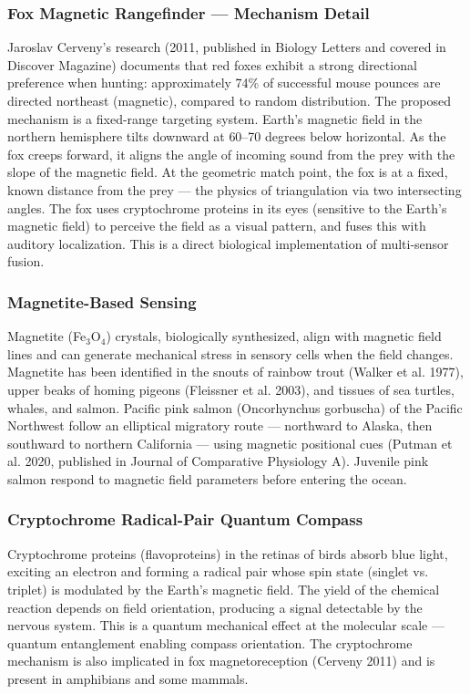 \documentclass[11pt,letterpaper]{article}
\begin{document}
\subsubsection{Fox Magnetic Rangefinder --- Mechanism Detail}
Jaroslav Cerveny's research (2011, published in Biology Letters and covered in Discover Magazine) documents that red foxes exhibit a strong directional preference when hunting: approximately 74\% of successful mouse pounces are directed northeast (magnetic), compared to random distribution. The proposed mechanism is a fixed-range targeting system. Earth's magnetic field in the northern hemisphere tilts downward at 60--70 degrees below horizontal. As the fox creeps forward, it aligns the angle of incoming sound from the prey with the slope of the magnetic field. At the geometric match point, the fox is at a fixed, known distance from the prey --- the physics of triangulation via two intersecting angles. The fox uses cryptochrome proteins in its eyes (sensitive to the Earth's magnetic field) to perceive the field as a visual pattern, and fuses this with auditory localization. This is a direct biological implementation of multi-sensor fusion.

\subsubsection{Magnetite-Based Sensing}
Magnetite (Fe$_3$O$_4$) crystals, biologically synthesized, align with magnetic field lines and can generate mechanical stress in sensory cells when the field changes. Magnetite has been identified in the snouts of rainbow trout (Walker et al. 1977), upper beaks of homing pigeons (Fleissner et al. 2003), and tissues of sea turtles, whales, and salmon. Pacific pink salmon (Oncorhynchus gorbuscha) of the Pacific Northwest follow an elliptical migratory route --- northward to Alaska, then southward to northern California --- using magnetic positional cues (Putman et al. 2020, published in Journal of Comparative Physiology A). Juvenile pink salmon respond to magnetic field parameters before entering the ocean.

\subsubsection{Cryptochrome Radical-Pair Quantum Compass}
Cryptochrome proteins (flavoproteins) in the retinas of birds absorb blue light, exciting an electron and forming a radical pair whose spin state (singlet vs. triplet) is modulated by the Earth's magnetic field. The yield of the chemical reaction depends on field orientation, producing a signal detectable by the nervous system. This is a quantum mechanical effect at the molecular scale --- quantum entanglement enabling compass orientation. The cryptochrome mechanism is also implicated in fox magnetoreception (Cerveny 2011) and is present in amphibians and some mammals.
\end{document}
